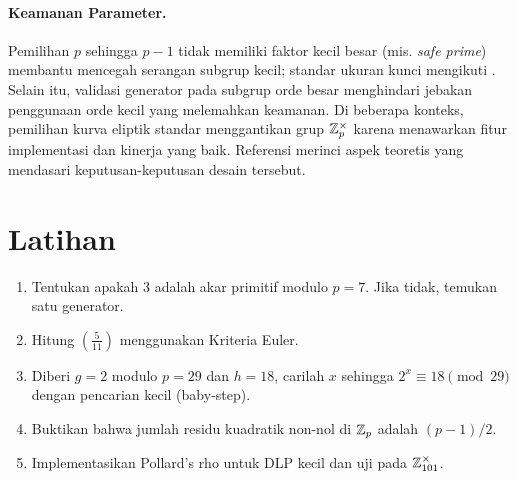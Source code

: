 \documentclass[../main.tex]{subfiles}
\begin{document}
\paragraph{Keamanan Parameter.} Pemilihan \(p\) sehingga \(p-1\) tidak memiliki faktor kecil besar (mis. \emph{safe prime}) membantu mencegah serangan subgrup kecil; standar ukuran kunci mengikuti \citep{nist_sp_800_131a}. Selain itu, validasi generator pada subgrup orde besar menghindari jebakan penggunaan orde kecil yang melemahkan keamanan. Di beberapa konteks, pemilihan kurva eliptik standar menggantikan grup \(\mathbb{Z}_p^\times\) karena menawarkan fitur implementasi dan kinerja yang baik. Referensi \citep{shoup_nt} merinci aspek teoretis yang mendasari keputusan-keputusan desain tersebut.

\section{Latihan}
\begin{enumerate}
  \item Tentukan apakah \(3\) adalah akar primitif modulo \(p=7\). Jika tidak, temukan satu generator.
  \item Hitung \(\left(\tfrac{5}{11}\right)\) menggunakan Kriteria Euler.
  \item Diberi \(g=2\) modulo \(p=29\) dan \(h=18\), carilah \(x\) sehingga \(2^x\equiv 18\pmod{29}\) dengan pencarian kecil (baby-step).
  \item Buktikan bahwa jumlah residu kuadratik non-nol di \(\mathbb{Z}_p\) adalah \((p-1)/2\).
  \item Implementasikan Pollard's rho untuk DLP kecil dan uji pada \(\mathbb{Z}_{101}^\times\).
\end{enumerate}
\end{document}
